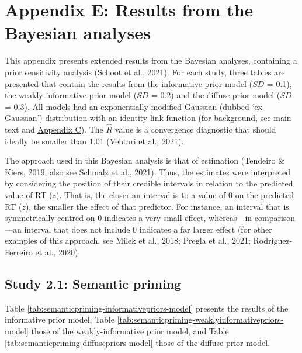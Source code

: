 \documentclass[
  12pt,
  man,floatsintext]{apa7}
\begin{document}
\clearpage

\renewcommand{\thefigure}{E\arabic{figure}} \setcounter{figure}{0}
\renewcommand{\thetable}{E\arabic{table}} \setcounter{table}{0}

\hypertarget{appendix-E-Bayesian-analysis-results}{%
\section{Appendix E: Results from the Bayesian analyses}\label{appendix-E-Bayesian-analysis-results}}

This appendix presents extended results from the Bayesian analyses, containing a prior sensitivity analysis (Schoot et al., 2021). For each study, three tables are presented that contain the results from the informative prior model (\(SD\) = 0.1), the weakly-informative prior model (\(SD\) = 0.2) and the diffuse prior model (\(SD\) = 0.3). All models had an exponentially modified Gaussian (dubbed `ex-Gaussian') distribution with an identity link function (for background, see main text and \protect\hyperlink{appendix-C-Bayesian-analysis-diagnostics}{\underline{Appendix C}}). The \(\widehat R\) value is a convergence diagnostic that should ideally be smaller than 1.01 (Vehtari et al., 2021).

The approach used in this Bayesian analysis is that of estimation (Tendeiro \& Kiers, 2019; also see Schmalz et al., 2021). Thus, the estimates were interpreted by considering the position of their credible intervals in relation to the predicted value of RT (\(z\)). That is, the closer an interval is to a value of 0 on the predicted RT (\(z\)), the smaller the effect of that predictor. For instance, an interval that is symmetrically centred on 0 indicates a very small effect, whereas---in comparison---an interval that does not include 0 indicates a far larger effect (for other examples of this approach, see Milek et al., 2018; Pregla et al., 2021; Rodríguez-Ferreiro et al., 2020).

\hypertarget{study-2.1-semantic-priming-4}{%
\subsection{Study 2.1: Semantic priming}\label{study-2.1-semantic-priming-4}}

Table \ref{tab:semanticpriming-informativepriors-model} presents the results of the informative prior model, Table \ref{tab:semanticpriming-weaklyinformativepriors-model} those of the weakly-informative prior model, and Table \ref{tab:semanticpriming-diffusepriors-model} those of the diffuse prior model.
\end{document}
